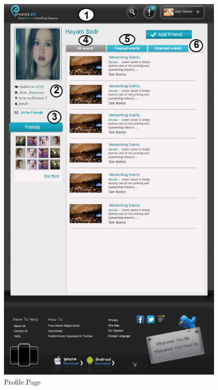 \documentclass[12pt,a4paper,class,twoside,openany]{report}
\begin{document}
{\begin{figure}
\begin{center}
\includegraphics[height=8 in]{8-4}
\caption{Profile Page}
\label{fg:8-4}
\end{center}
\end{figure}
\begin{figure}
\begin{center}

\end{center}
\end{figure}}
\end{document}
